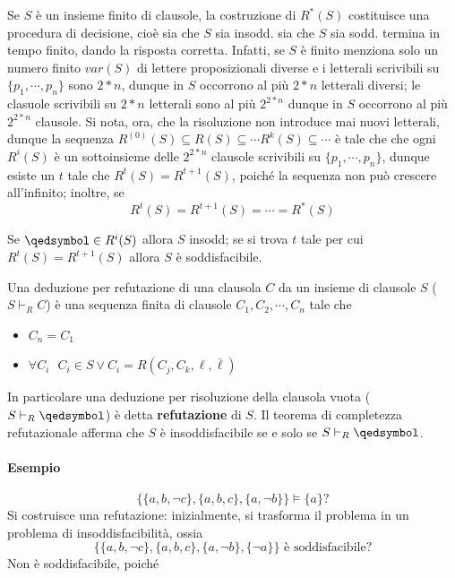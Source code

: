 \begin{oss}
        Se $S$ è un insieme finito di clausole, la costruzione di $R^*(S)$ 
        costituisce una procedura di decisione, cioè sia che $S$ sia insodd. 
        sia che $S$ sia sodd. termina in tempo finito, dando la risposta 
        corretta. Infatti, se $S$ è finito menziona solo un numero finito $var(S)$ di 
        lettere proposizionali diverse e i letterali scrivibili su $\{p_1, \cdots, p_n\}$ 
        sono $2*n$, dunque in $S$ occorrono al più $2*n$ letterali diversi; le 
        clasuole scrivibili su $2*n$ letterali sono al più $2^{2*n}$ dunque 
        in $S$ occorrono al più $2^{2*n}$ clausole. 
        Si nota, ora, che la risoluzione non introduce mai nuovi letterali, 
        dunque la sequenza $R^{(0)}(S) \subseteq R(S) \subseteq \cdots R^{k}(S) \subseteq \cdots$ 
        è tale che  che ogni $R^{i}(S)$ è un sottoinsieme delle $2^{2*n}$ clausole 
        scrivibili su $\{p_1, \cdots, p_n\}$, dunque esiste un $t$ tale che 
        $R^{t}(S) = R^{t+1}(S)$, poiché la sequenza non può crescere all'infinito; 
        inoltre, se 
        $$
        R^{t}(S) = R^{t+1}(S) = \cdots = R^*(S)
        $$
\end{oss}
\begin{oss}
        Se $\qedsymbol \in R^i(S)$ allora $S$ insodd; se si trova $t$ tale per 
        cui $R^t(S) = R^{t+1}(S)$ allora $S$ è soddisfacibile.
\end{oss}
\begin{oss}
        Una deduzione per refutazione di una clausola $C$ da un insieme di clausole 
        $S$ ($S \vdash_R C$) è una sequenza finita di clausole 
        $C_1,C_2, \cdots, C_n$ tale che 
        \begin{itemize}
                \item $C_n = C_1$
                \item $\forall C_i ~~~ C_i \in S \lor C_i = R(C_j, C_k, \ell, \bar{\ell})$
        \end{itemize}
        In particolare una deduzione per risoluzione della clausola vuota 
        ($S \vdash_R \qedsymbol$) è detta \textbf{refutazione} di $S$. 
        Il teorema di completezza refutazionale afferma che $S$ è insoddisfacibile 
        se e solo se $S \vdash_R \qedsymbol$.
\end{oss}

\paragraph{Esempio}
$$
\{\{a, b, \neg c\}, \{a, b, c\}, \{a, \neg b\}\} \models \{a\}?
$$
Si costruisce una refutazione: 
inizialmente, si trasforma il problema in un problema di insoddisfacibilità, 
ossia 
$$
\{\{a, b, \neg c\}, \{a, b, c\}, \{a, \neg b\}, \{\neg a\}\} \text{ è soddisfacibile?}
$$
Non è soddisfacibile, poiché 

